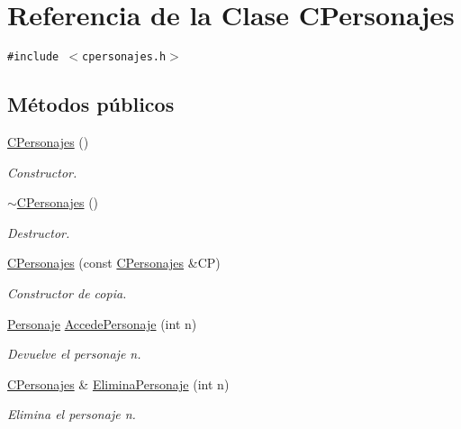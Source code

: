 \hypertarget{class_c_personajes}{
\section{Referencia de la Clase CPersonajes}
\label{class_c_personajes}
}
{\tt \#include $<$cpersonajes.h$>$}

\subsection*{Métodos públicos}
\begin{CompactItemize}
\item 
\hyperlink{class_c_personajes_fc9f1e237eb306984f85393ff4e65842}{CPersonajes} ()
\begin{CompactList}\small\item\em Constructor. \item\end{CompactList}\item 
\hyperlink{class_c_personajes_3bcd959bc1702107853482729687b1e0}{$\sim$CPersonajes} ()
\begin{CompactList}\small\item\em Destructor. \item\end{CompactList}\item 
\hyperlink{class_c_personajes_d74cf8097ab2684867204fda7d5f1443}{CPersonajes} (const \hyperlink{class_c_personajes}{CPersonajes} \&CP)
\begin{CompactList}\small\item\em Constructor de copia. \item\end{CompactList}\item 
\hyperlink{class_personaje}{Personaje} \hyperlink{class_c_personajes_7aa7d31aa91c44660857df971242f9f3}{AccedePersonaje} (int n)
\begin{CompactList}\small\item\em Devuelve el personaje n. \item\end{CompactList}\item 
\hyperlink{class_c_personajes}{CPersonajes} \& \hyperlink{class_c_personajes_43e8d3445e65eb0ab0d4b842a7e73a3a}{EliminaPersonaje} (int n)
\begin{CompactList}\small\item\em Elimina el personaje n. \item\end{CompactList}\item 

\end{CompactItemize}
